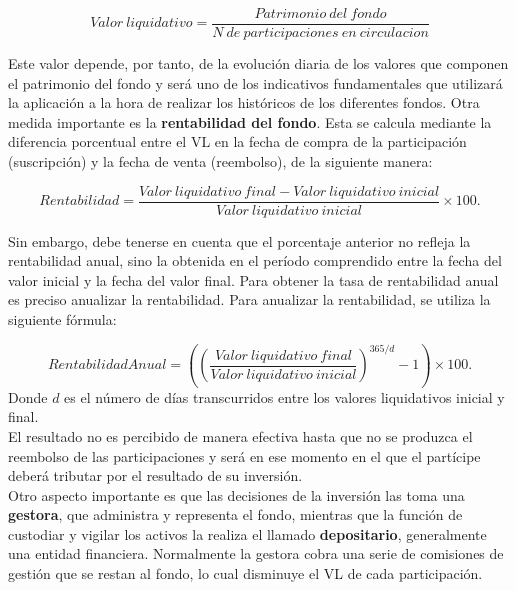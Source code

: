 \documentclass[12pt, a4paper]{book}
\begin{document}
\begin{center}
	\begin{equation}
	Valor\ liquidativo = \frac{ Patrimonio\ del\ fondo}{N\ de\ participaciones\ en\ circulacion}
	\end{equation}
	\label{valorliquidativo}
\end{center}
\vspace{1cm}

\newpage

Este valor depende, por tanto, de la evolución diaria de los valores que componen el patrimonio del fondo y será uno de los indicativos fundamentales que utilizará la aplicación a la hora de realizar los históricos de los diferentes fondos. Otra medida importante es la \textbf{rentabilidad del fondo}. Esta se calcula mediante la diferencia porcentual entre el \gls{VL} en la fecha de compra de la participación (suscripción) y la fecha de venta (reembolso), de la siguiente manera:

\begin{center}
	\begin{equation}
	Rentabilidad = \frac{ Valor\ liquidativo\ final - Valor\ liquidativo\ inicial}{Valor\ liquidativo\ inicial } \times 100.
	\end{equation}
\end{center}

Sin embargo, debe tenerse en cuenta que el porcentaje anterior no refleja la rentabilidad anual, sino la obtenida en el período comprendido entre la fecha del valor inicial y la fecha del valor final. Para obtener la tasa de rentabilidad anual es preciso anualizar la rentabilidad. Para anualizar la rentabilidad, se utiliza la siguiente fórmula:

\begin{equation}
Rentabilidad Anual=\left(\left(\frac{ Valor\ liquidativo\ final}{Valor\ liquidativo\ inicial}\right)^{365/d}-1\right) \times 100.
\end{equation} 
Donde $d$ es el número de días transcurridos entre los valores liquidativos inicial y final.\\



El resultado no es percibido de manera efectiva hasta que no se produzca el reembolso de las participaciones y será en ese momento en el que el partícipe deberá tributar por el resultado de su inversión. \\


Otro aspecto importante es que las decisiones de la inversión las toma una \textbf{gestora}, que administra y representa el fondo, mientras que la función de custodiar y vigilar los activos la realiza el llamado \textbf{depositario}, generalmente una entidad financiera. Normalmente la gestora cobra una serie de comisiones de gestión que se restan al fondo, lo cual disminuye el \gls{VL} de cada participación.\\
\end{document}
